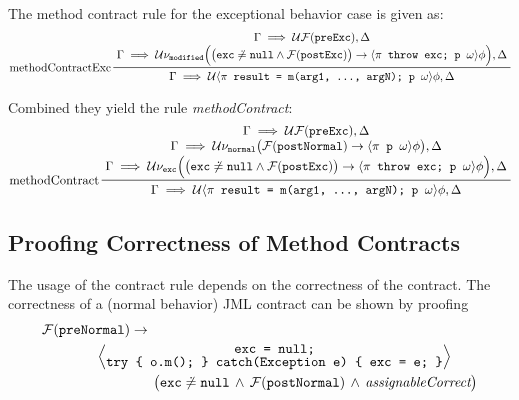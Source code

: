 \documentclass[a4paper, 11pt, accentcolor = tud3b]{tudreport}
\begin{document}
				The method contract rule for the exceptional behavior case is given as:
				\begin{equation*}
					\prftree[l]
						{methodContractExc}
						{\let\scriptstyle\textstyle \substack{
						 \Gamma \implies \mathcal{U} \mathcal{F}(\texttt{preExc}), \Delta \\
					     \Gamma \implies \mathcal{U} \nu_\texttt{modified} \Big( \big( \texttt{exc} \not\doteq \texttt{null} \land \mathcal{F}(\texttt{postExc}) \big) \to \langle \pi \texttt{ throw exc; p } \omega \rangle \phi \Big), \Delta}}
						{\Gamma \implies \mathcal{U} \langle \pi \texttt{ result = m(arg1, ..., argN); p } \omega \rangle \phi, \Delta}
				\end{equation*}
				
				Combined they yield the rule \textit{methodContract}:
				\begin{equation*}
					\prftree[l]
						{methodContract}
						{\let\scriptstyle\textstyle \substack{
						 \Gamma \implies \mathcal{U} \mathcal{F}(\texttt{preExc}), \Delta \\
						 \Gamma \implies \mathcal{U} \nu_\texttt{normal} \big( \mathcal{F}(\texttt{postNormal}) \to \langle \pi \texttt{ p } \omega \rangle \phi \big), \Delta \\
						 \Gamma \implies \mathcal{U} \nu_\texttt{exc} \Big( \big( \texttt{exc} \not\doteq \texttt{null} \land \mathcal{F}(\texttt{postExc}) \big) \to \langle \pi \texttt{ throw exc; p } \omega \rangle \phi \Big), \Delta}}
						{\Gamma \implies \mathcal{U} \langle \pi \texttt{ result = m(arg1, ..., argN); p } \omega \rangle \phi, \Delta}
				\end{equation*}

			\subsection{Proofing Correctness of Method Contracts}
				The usage of the contract rule depends on the correctness of the contract. The correctness of a (normal behavior) JML contract can be shown by proofing
				\begin{align*}
					&\mathcal{F}(\texttt{preNormal}) \to \\
					&\qquad\qquad \Big\langle { \let\scriptstyle\textstyle \substack{\texttt{exc = null;} \\ \texttt{try \{ o.m(); \} catch(Exception e) \{ exc = e; \}}} } \Big\rangle \\
					&\qquad\qquad\qquad\qquad \big( \texttt{exc} \not\doteq \texttt{null} \,\land\, \mathcal{F}(\texttt{postNormal}) \,\land\, \textit{assignableCorrect} \big)
				\end{align*}
\end{document}
